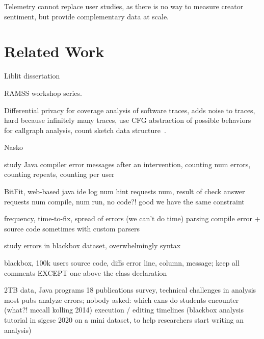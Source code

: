 \documentclass[english,submission,cleveref]{programming}
\begin{document}
Telemetry cannot replace user studies, as there is no way to measure
creator sentiment, but provide complementary data at scale.


\section{Related Work}
\label{s:related}

Liblit dissertation~\cite{liblit-thesis}

RAMSS workshop series.

Differential privacy for coverage analysis of software traces,
adds noise to traces,
hard because infinitely many traces,
use CFG abstraction of possible behaviors for callgraph analysis,
count sketch data structure~\cite{hlzbr-ecoop-2021}.

Nasko~\cite{zhlbr-cc-2020,zhlbr-oopsla-2020,hlzbr-ecoop-2021}


\cite{bgimgm-cse-2016}
study Java compiler error messages after an intervention, counting num errors,
counting repeats, counting per user

\cite{anna-russo-kennedy-ms-2006}
BitFit, web-based java ide log num hint requests num, result of check answer
requests num compile, num run, no code?! good we have the same constraint

\cite{ab-sigcse-2015}
frequency, time-to-fix, spread of errors
 (we can't do time)
parsing compile error + source code
 sometimes with custom parsers

\cite{m-masters-2016}
study errors in blackbox dataset,
 overwhelmingly syntax

\cite{bkmu-sigcse-2014}
blackbox, 100k users
source code, diffs
error line, column, message;
keep all comments EXCEPT one above the class declaration


\cite{bask-icer-2018}
2TB data, Java programs
18 publications survey, technical challenges in analysis
 most pubs analyze errors;
nobody asked:
 which exns do students encounter (what?! mccall kolling 2014)
 execution / editing timelines
(blackbox analysis tutorial in sigcse 2020 on a mini dataset, to help researchers start writing an analysis)
\end{document}
